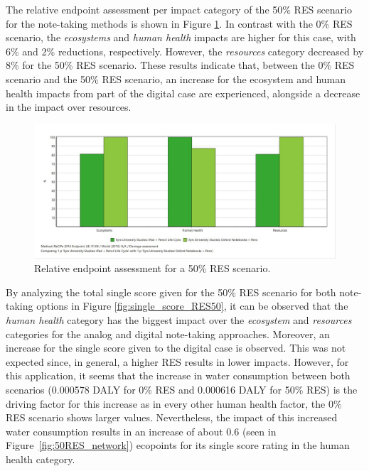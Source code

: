 The relative endpoint assessment per impact category of the 50\% RES scenario for the note-taking methods is shown in Figure \ref{fig:damage_assessment_RES_50}. In contrast with the 0\% RES scenario, the \textit{ecosystems} and \textit{human health} impacts are higher for this case, with 6\% and 2\% reductions, respectively. However, the \textit{resources} category decreased by 8\% for the 50\% RES scenario. These results indicate that, between the 0\% RES scenario and the 50\% RES scenario, an increase for the ecosystem and human health impacts from part of the digital case are experienced, alongside a decrease in the impact over resources.  

\begin{figure}[H]
    \centering
    \includegraphics[width=\textwidth]{images/RES_50/Damage_Assessment_RES_50.JPG}
    \caption{Relative endpoint assessment for a 50\% RES scenario.}\label{fig:damage_assessment_RES_50}
\end{figure}

By analyzing the total single score given for the 50\% RES scenario for both note-taking options in Figure \ref{fig:single_score_RES50}, it can be observed that the \textit{human health} category has the biggest impact over the \textit{ecosystem} and \textit{resources} categories for the analog and digital note-taking approaches. Moreover, an increase for the single score given to the digital case is observed. This was not expected since, in general, a higher RES results in lower impacts. However, for this application, it seems that the increase in water consumption between both scenarios (0.000578 DALY for 0\% RES and 0.000616 DALY for 50\% RES) is the driving factor for this increase as in every other human health factor, the 0\% RES scenario shows larger values. Nevertheless, the impact of this increased water consumption results in an increase of about 0.6 (seen in Figure~\ref{fig:50RES_network}) ecopoints for its single score rating in the human health category.


